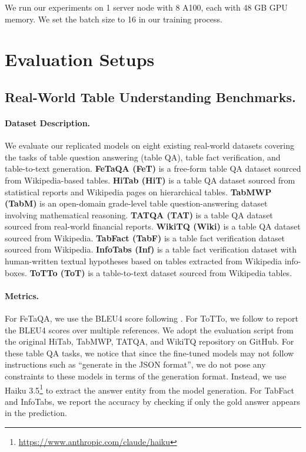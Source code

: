 \documentclass[11pt]{article}
\begin{document}
We run our experiments on 1 server node with 8 A100, each with 48 GB GPU memory.
We set the batch size to 16 in our training process.

\section{Evaluation Setups}
\label{app-sec: eval-benchmarks}
\subsection{Real-World Table Understanding Benchmarks.}
\paragraph{Dataset Description.}
We evaluate our replicated models on eight existing real-world datasets covering the tasks of table question answering (table QA), table fact verification, and table-to-text generation.
\textbf{FeTaQA (FeT)} \citep{nan-etal-2022-fetaqa} is a free-form table QA dataset sourced from Wikipedia-based tables.
\textbf{HiTab (HiT)} \citep{cheng-etal-2022-hitab} is a table QA dataset sourced from statistical reports and Wikipedia pages on hierarchical tables.
\textbf{TabMWP (TabM)} \citep{lu2022dynamic} is an open-domain grade-level table question-answering dataset involving mathematical reasoning.
\textbf{TATQA (TAT)} \citep{zhu-etal-2021-tat} is a table QA dataset sourced from real-world financial reports.
\textbf{WikiTQ (Wiki)} \citep{pasupat-liang-2015-compositional} is a table QA dataset sourced from Wikipedia.
\textbf{TabFact (TabF)} \citep{Chen2020TabFact} is a table fact verification dataset sourced from Wikipedia.
\textbf{InfoTabs (Inf)} \citep{gupta-etal-2020-infotabs} is a table fact verification dataset with human-written textual hypotheses based on tables extracted from Wikipedia info-boxes.
\textbf{ToTTo (ToT)} \citep{parikh-etal-2020-totto} is a table-to-text dataset sourced from Wikipedia tables.

\paragraph{Metrics.}

For FeTaQA, we use the BLEU4 score following \citet{nan-etal-2022-fetaqa}.
For ToTTo, we follow \citet{xie-etal-2022-unifiedskg} to report the BLEU4 scores over multiple references.
We adopt the evaluation script from the original HiTab, TabMWP, TATQA, and WikiTQ repository on GitHub.
For these table QA tasks, we notice that since the fine-tuned models may not follow instructions such as ``generate in the JSON format'', we do not pose any constraints to these models in terms of the generation format.
Instead, we use Haiku 3.5\footnote{\url{https://www.anthropic.com/claude/haiku}} to extract the answer entity from the model generation. 
For TabFact and InfoTabs, we report the accuracy by checking if only the gold answer appears in the prediction.
\end{document}

